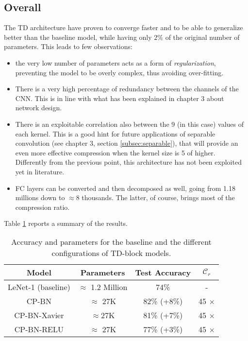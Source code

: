 \subsection{Overall} 
The TD architecture have proven to converge faster and to be able to generalize better than the baseline model, while having only $2\%$ of the original number of parameters. This leads to few observations: 
    \begin{itemize}
        \item the very low number of parameters acts as a form of \emph{regularization}, preventing the model to be overly complex, thus avoiding over-fitting. 
        
        \item There is a very high percentage of redundancy between the channels of the CNN. This is in line with what has been explained in chapter 3 about network design. 
        
        \item There is an exploitable correlation also between the 9 (in this case) values of each kernel. This is a good hint for future applications of separable convolution (see chapter 3, section \ref{subsec:separable}), that will provide an even more effective compression when the kernel size is 5 of higher. \\
        Differently from the previous point, this architecture has not been exploited yet in literature. 
        
        \item FC layers can be converted and then decomposed as well, going from 1.18 millions down to $\approx$8 thousands. The latter, of course, brings most of the compression ratio. 
    \end{itemize}

Table \ref{tab:td-conf} reports a summary of the results. 
\newline 

\begin{table}[]
\centering
\begin{tabular}{@{}cccc@{}}
\toprule
Model & Parameters & Test Accuracy & $\mathcal{C}_r$ \\ \midrule
\multicolumn{1}{|c|}{LeNet-1 (baseline)} & \multicolumn{1}{c|}{$\approx$ 1.2 Million} & \multicolumn{1}{c|}{74\%} & \multicolumn{1}{c|}{-} \\ \midrule
\multicolumn{1}{|c|}{CP-BN} & \multicolumn{1}{c|}{$\approx$ 27K} & \multicolumn{1}{c|}{82\% (+8\%)} & \multicolumn{1}{c|}{45 $\times$} \\ \midrule
\multicolumn{1}{|c|}{CP-BN-Xavier} & \multicolumn{1}{c|}{$\approx$27K} & \multicolumn{1}{c|}{81\% (+7\%)} & \multicolumn{1}{c|}{45 $\times$} \\ \midrule
\multicolumn{1}{|c|}{CP-BN-RELU} & \multicolumn{1}{c|}{$\approx$ 27K} & \multicolumn{1}{c|}{77\% (+3\%)} & \multicolumn{1}{c|}{45 $\times$} \\ \bottomrule
\end{tabular}
\caption{Accuracy and parameters for the baseline and the different configurations of TD-block models.}
\label{tab:td-conf}
\end{table}

